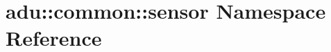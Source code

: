\hypertarget{namespaceadu_1_1common_1_1sensor}{\section{adu\-:\-:common\-:\-:sensor Namespace Reference}
\label{namespaceadu_1_1common_1_1sensor}
}
